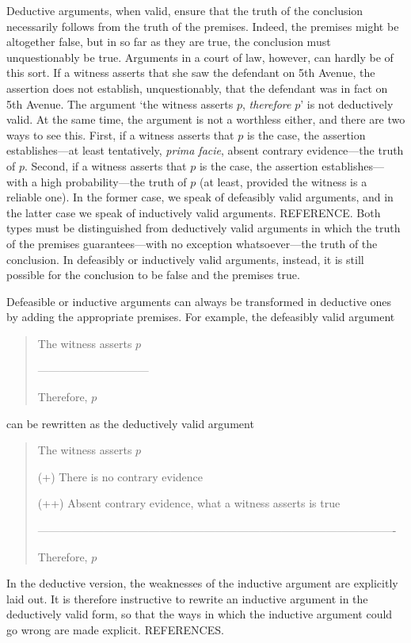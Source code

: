\documentclass[10pt]{article}
\begin{document}
Deductive arguments, when valid, ensure that the truth of the conclusion necessarily follows from the truth of the premises. 
Indeed, the premises might be altogether false, but in so far as they are true, 
the conclusion must unquestionably be true. Arguments in a court of law, however, can hardly be of this sort. If a witness asserts that she saw the defendant on 5th Avenue, the assertion does not establish, unquestionably, that the defendant was in fact on 5th Avenue. The argument `the witness asserts $p$, \textit{therefore} $p$' is not deductively valid. At the same time, the argument is not a worthless either, and there are two ways to see this. First, if a witness asserts that $p$ is the case, the assertion establishes---at least tentatively, \textit{prima facie}, absent contrary evidence---the truth of $p$. Second, if a witness asserts that $p$ is the case, the assertion establishes---with a high probability---the truth of $p$ (at least, provided the witness is a reliable one). In the former case, we speak of defeasibly valid arguments, and in the latter case we speak of inductively valid arguments. REFERENCE. Both types must be distinguished from deductively valid arguments in which the truth of the premises guarantees---with no exception whatsoever---the truth of the conclusion. In defeasibly or inductively valid arguments, instead, it is still possible for the conclusion to be false and the premises true. 

Defeasible or inductive 
arguments can always be transformed in deductive 
ones by adding the appropriate premises. For example, 
the defeasibly valid argument
%
\begin{quote}
The witness asserts $p$

------------------------------

Therefore, $p$
\end{quote}
%
can be rewritten as the deductively valid argument 
%
\begin{quote}
The witness asserts $p$

(+) There is no contrary evidence 

(++) Absent contrary evidence, what a witness asserts is true 

-------------------------------------------------------------------------------------------------

Therefore, $p$
\end{quote}
%
In the deductive version, the weaknesses of the inductive argument are explicitly laid out. It is therefore instructive to rewrite an inductive argument in the deductively valid form, so that the ways in which the inductive argument could go wrong are made explicit.  REFERENCES. 
\end{document}
